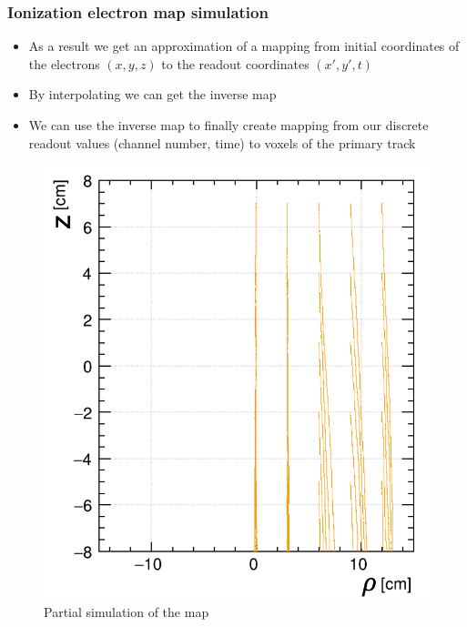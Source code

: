\documentclass{beamer}
\begin{document}
	\begin{frame}
		\frametitle{Ionization electron map simulation}
		\begin{itemize}
			\item As a result we get an approximation of a mapping from initial coordinates of the electrons $(x,y,z)$ to the readout coordinates $(x',y',t)$
			\item By interpolating we can get the inverse map
			\item We can use the inverse map to finally create mapping from our discrete readout values (channel number, time) to voxels of the primary track
		\end{itemize}
		\begin{figure}
			\centering
			\includegraphics[height=0.4\textheight]{../images/map_lines.png}
			\caption{Partial simulation of the map}
		\end{figure}
	\end{frame}
\end{document}
